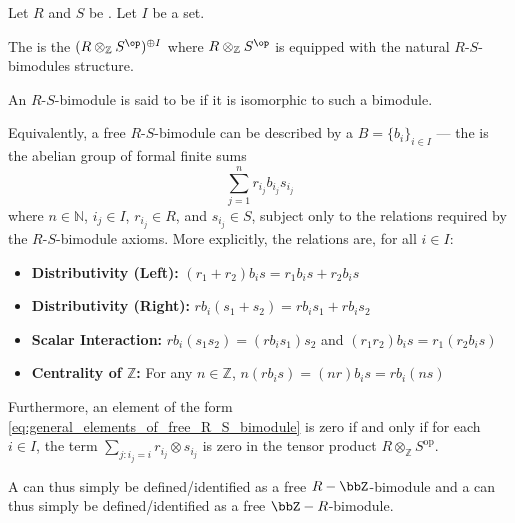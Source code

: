 \begin{definition} \label{definition:free_bimodule_over_rings}
Let $R$ and $S$ be . Let $I$ be a set. 

The  is the  $(R \otimes_{\mathbb{Z}} S^{\op})^{\oplus I}$ where $R \otimes_{\mathbb{Z}} S^{\op}$ is equipped with the natural $R$-$S$-bimodules structure. 

An $R$-$S$-bimodule is said to be  if it is isomorphic to such a bimodule.

Equivalently, a free $R$-$S$-bimodule can be described by a  $B = \{b_i\}_{i \in I}$ --- the  is the abelian group of formal finite sums
\begin{equation} \label{eq:general_elements_of_free_R_S_bimodule}
\sum_{j=1}^n r_{i_j} b_{i_j}  s_{i_j}
\end{equation}
where $n \in \mathbb{N}$, $i_j \in I$, $r_{i_j} \in R$, and $s_{i_j} \in S$, subject only to the relations required by the $R$-$S$-bimodule axioms. More explicitly, the relations are, for all $i \in I$:
\begin{itemize}
    \item \textbf{Distributivity (Left):} $(r_1 + r_2) b_i s = r_1 b_i s + r_2 b_i s$
    \item \textbf{Distributivity (Right):} $r b_i (s_1 + s_2) = r b_i s_1 + r b_i s_2$
    \item \textbf{Scalar Interaction:} $r b_i (s_1 s_2) = (r b_i s_1) s_2$ and $(r_1 r_2) b_i s = r_1 (r_2 b_i s)$
    \item \textbf{Centrality of $\mathbb{Z}$:} For any $n \in \mathbb{Z}$, $n(r b_i s) = (nr) b_i s = r b_i (ns)$
\end{itemize}
Furthermore, an element of the form \eqref{eq:general_elements_of_free_R_S_bimodule} is zero if and only if for each $i \in I$, the term $\sum_{j: i_j = i} r_{i_j} \otimes s_{i_j}$ is zero in the tensor product $R \otimes_{\mathbb{Z}} S^{\text{op}}$.

A  can thus simply be defined/identified as a free $R-\bbZ$-bimodule and a  can thus simply be defined/identified as a free $\bbZ-R$-bimodule.
\end{definition}